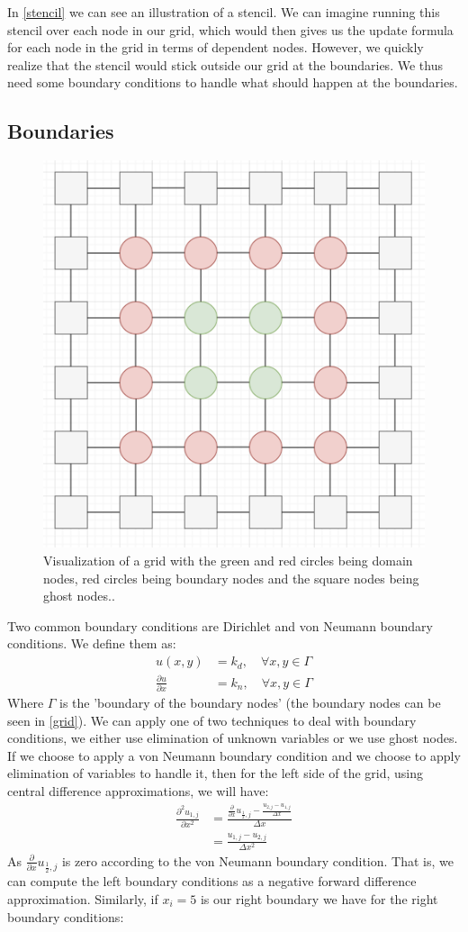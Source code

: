 In \autoref{stencil} we can see an illustration of a stencil. We can imagine running this stencil over each node in our grid, which would then gives us the update formula for each node in the grid in terms of dependent nodes. However, we quickly realize that the stencil would stick outside our grid at the boundaries. We thus need some boundary conditions to handle what should happen at the boundaries. 

\subsection{Boundaries}
\begin{figure}[H]
	\centering
	\includegraphics[width=0.3\linewidth]{Materials/grid}
	\caption{Visualization of a grid with the green and red circles being domain nodes, red circles being boundary nodes and the square nodes being ghost nodes..}
	\label{grid}
\end{figure}
Two common boundary conditions are Dirichlet and von Neumann boundary conditions. We define them as:
\begin{align*}
	u(x,y) &= k_d, \quad \forall x,y \in \Gamma\\
	\frac{\partial u}{\partial x} &= k_n, \quad \forall x,y \in \Gamma
\end{align*}
Where $\Gamma$ is the 'boundary of the boundary nodes' (the boundary nodes can be seen in \autoref{grid}). We can apply one of two techniques to deal with boundary conditions, we either use elimination of unknown variables or we use ghost nodes. If we choose to apply a von Neumann boundary condition and we choose to apply elimination of variables to handle it, then for the left side of the grid, using central difference approximations, we will have:
\begin{align*}
	\frac{\partial^2 u_{1,j}}{\partial x^2} &= \frac{\frac{\partial}{\partial x}u_{\frac{1}{2},j} - \frac{u_{2,j} - u_{1,j}}{\Delta x}}{\Delta x}\\
	&= \frac{u_{1,j} - u_{2,j}}{\Delta x^2}
\end{align*}
As $\frac{\partial}{\partial x}u_{\frac{1}{2},j}$ is zero according to the von Neumann boundary condition. That is, we can compute the left boundary conditions as a negative forward difference approximation. Similarly, if $x_i = 5$ is our right boundary we have for the right boundary conditions:
